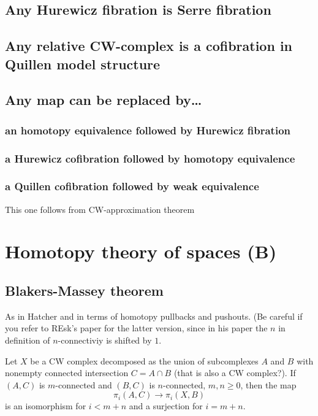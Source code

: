 \begin{remark}
\subsection{Any Hurewicz fibration is Serre fibration}
\subsection{Any relative CW-complex is a cofibration in Quillen model structure}
\subsection{Any map can be replaced by…} 
\subsubsection{an homotopy equivalence followed by Hurewicz fibration}
\subsubsection{a Hurewicz cofibration followed by homotopy equivalence}
\subsubsection{a Quillen cofibration followed by weak equivalence}
This one follows from CW-approximation theorem

\section{Homotopy theory  of spaces (B)}

\subsection{Blakers-Massey theorem}

As in Hatcher and in terms of homotopy pullbacks and pushouts. (Be careful if you refer to REsk's paper for the latter version, since in his paper the $n$ in definition of $n$-connectiviy is shifted by $1$.
\begin{thm}
	Let $X$ be a CW complex decomposed as the union of subcomplexes $A$ and $B$ with nonempty connected intersection $C=A\cap B$ {\color{magenta}(that is also a CW complex?)}. If $(A,C)$ is $m$-connected and $(B,C)$ is $n$-connected, $m,n\geq 0$, then the map
	$$\pi_{i}(A,C)\to \pi_{i}(X,B)$$
is an isomorphism for $i<m+n$ and a surjection for $i=m+n$.
\end{thm}


\end{remark}
